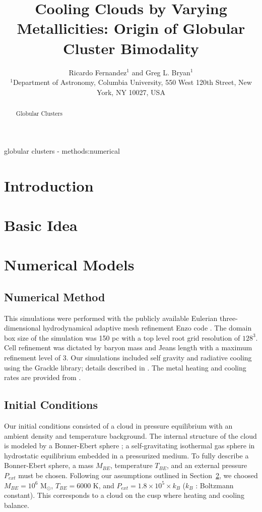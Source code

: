 \documentclass[useAMS,usenatbib]{mn2e}
\title{Cooling Clouds by Varying Metallicities: Origin of Globular Cluster Bimodality}
\author[R. Fernandez et al.]{Ricardo Fernandez$^{1}$ and Greg L. Bryan$^{1}$\\
$^{1}$Department of Astronomy, Columbia University, 550 West 120th Street, New York, NY 10027, USA}
\newcommand{\msun}{{M$_\odot$}}
\begin{document}
\date{}


\maketitle


\begin{abstract}
Globular Clusters
\end{abstract}

\begin{keywords}
globular clusters - methods:numerical
\end{keywords}

%
\section{Introduction}

%
\section{Basic Idea}
\label{sec:basic}

%
\section{Numerical Models}
\label{sec:numerical}
\subsection{Numerical Method}
This simulations were performed with the publicly available Eulerian three-dimensional
hydrodynamical adaptive mesh refinement Enzo code \citep{Bryan2013}. The domain
box size of the simulation was 150 pc with a top level root grid resolution of $128^3$.
Cell refinement was dictated by baryon mass and Jeans length with a maximum refinement
level of 3. Our simulations included self gravity and radiative cooling using the
Grackle library; details described in \cite{Bryan2013}. The metal heating and
cooling rates are provided from \cite{Haardt2012}.

\subsection{Initial Conditions}
Our initial conditions consisted of a cloud in pressure equilibrium with an
ambient density and temperature background. The internal structure of the
cloud is modeled by a Bonner-Ebert sphere \cite{Bonnor1956}; a self-gravitating
isothermal gas sphere in hydrostatic equilibrium embedded in a pressurized  
medium. To fully describe a Bonner-Ebert sphere, a mass $M_{BE}$, temperature
$T_{BE}$, and an external pressure $P_{ext}$ must be chosen. Following our
assumptions outlined in Section~\ref{sec:basic}, we choosed
$M_{BE}=10^6$ \msun, $T_{BE}=6000$ K, and $P_{ext}=1.8\times10^5\times k_B$
($k_B$ : Boltzmann constant). This corresponds to a cloud on the cusp where
heating and cooling balance. 
\end{document}
